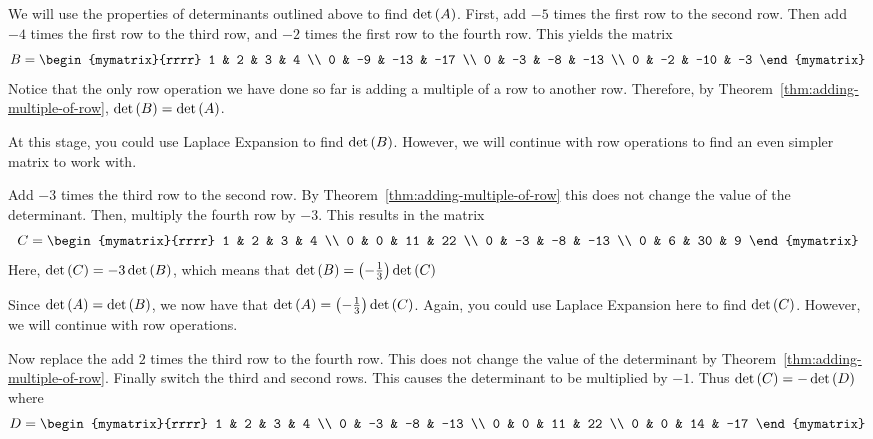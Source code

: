 \begin{solution}
We will use the properties of determinants outlined above to find $\det \left(A\right)$. First, add $-5$ times the first row to the second row. Then add $-4$ times the first row to the third row, and $-2$ times
the first row to the fourth row. This yields the matrix
\begin{equation*}
B=\begin{mymatrix}{rrrr}
1 & 2 & 3 & 4 \\
0 & -9 & -13 & -17 \\
0 & -3 & -8 & -13 \\
0 & -2 & -10 & -3
\end{mymatrix}
\end{equation*}
Notice that the only row operation we have done so far is adding a multiple 
of a row to another row. Therefore, by Theorem~\ref{thm:adding-multiple-of-row}, $\det \left(B\right) = \det \left(A\right)$. 

At this stage, you could use Laplace Expansion to find $\det \left(B\right)$. However, we will continue with row operations 
to find an even simpler matrix to work with.

Add $-3$ times the third row to the second row. By Theorem~\ref{thm:adding-multiple-of-row} this does not change the value of
the determinant. Then, multiply the fourth row by $-3$. This results in the matrix
\begin{equation*}
C=\begin{mymatrix}{rrrr}
1 & 2 & 3 & 4 \\
0 & 0 & 11 & 22 \\
0 & -3 & -8 & -13 \\
0 & 6 & 30 & 9
\end{mymatrix} 
\end{equation*}
Here, $\det \left(C\right) = -3 \det \left(B\right)$, which means that 
$\det \left(B\right) =\left(-\frac{1}{3}\right) \det \left(C\right) $

Since $\det \left(A\right) = \det \left(B\right)$, we now have that 
$\det \left(A\right) = \left(-\frac{1}{3}\right) \det \left(C\right)$. Again, you could use Laplace Expansion here to find $\det \left(C\right)$. However,
we will continue with row operations.

Now replace the add $2$ times the third row to the fourth row. This does not change the
value of the determinant by Theorem~\ref{thm:adding-multiple-of-row}. Finally switch the third
and second rows. This causes the determinant to be multiplied by $-1$. Thus $\det \left(C\right) = -\det \left(D\right) $ where
\begin{equation*}
D=\begin{mymatrix}{rrrr}
1 & 2 & 3 & 4 \\
0 & -3 & -8 & -13 \\
0 & 0 & 11 & 22 \\
0 & 0 & 14 & -17
\end{mymatrix}
\end{equation*}


\end{solution}
